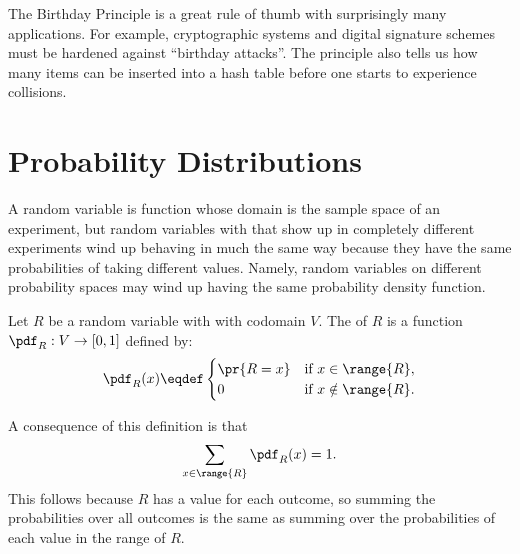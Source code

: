 The Birthday Principle is a great rule of thumb with surprisingly many
applications.  For example, cryptographic systems and digital signature
schemes must be hardened against ``birthday attacks''.  The principle also
tells us how many items can be inserted into a hash table before one
starts to experience collisions.



\section{Probability Distributions}

A random variable is function whose domain is the sample space of an
experiment, but random variables with that show up in completely different
experiments wind up behaving in much the same way because they have the
same probabilities of taking different values.  Namely, random variables
on different probability spaces may wind up having the same probability
density function.

\begin{definition}
Let $R$ be a random variable with with codomain $V$.
The  of $R$
is a function $\pdf_R : V \to [0,1]$ defined by:
%
\[
\pdf_R(x) \eqdef \begin{cases}
            \pr{R = x} & \text{if } x \in \range{R},\\
             0 & \text{if } x \notin \range{R}.
           \end{cases}
\]
\end{definition}
%
A consequence of this definition is that
%
\[
\sum_{x \in \range{R}} \pdf_R(x) = 1.
\]
This follows because $R$ has a value for each outcome, so summing the
probabilities over all outcomes is the same as summing over the
probabilities of each value in the range of $R$.

